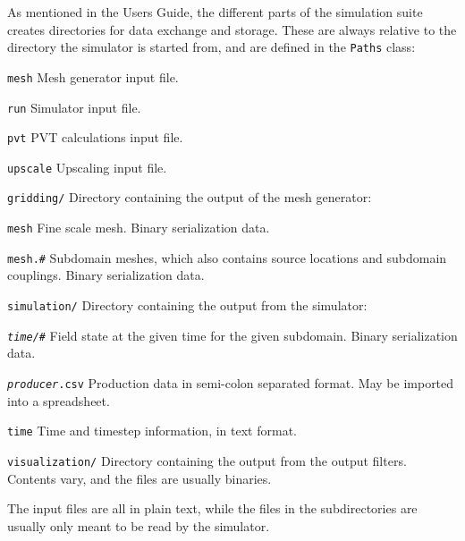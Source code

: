 

As mentioned in the Users Guide, the different parts of the simulation
suite creates directories for data exchange and storage. These are
always relative to the directory the simulator is started from, and
are defined in the \texttt{Paths} class:
\begin{list}{}{}
\item[\texttt{mesh}] Mesh generator input file.
\item[\texttt{run}] Simulator input file.
\item[\texttt{pvt}] PVT calculations input file.
\item[\texttt{upscale}] Upscaling input file.
\item[\texttt{gridding/}] Directory containing the output of the mesh
  generator:
  \begin{list}{}{}
  \item[\texttt{mesh}] Fine scale mesh. Binary serialization data.
  \item[\texttt{mesh.\#}] Subdomain meshes, which also contains source
    locations and subdomain couplings. Binary serialization data.
  \end{list}
\item[\texttt{simulation/}] Directory containing the output from the simulator:
  \begin{list}{}{}
  \item[\texttt{\textit{time/\#}}] Field state at the given time for
    the given subdomain. Binary serialization data.
  \item[\texttt{\textit{producer}.csv}] Production data in semi-colon
    separated format. May be imported into a spreadsheet.
  \item[\texttt{time}] Time and timestep information, in text format.
  \end{list}
\item[\texttt{visualization/}] Directory containing the output from
  the output filters. Contents vary, and the files are usually
  binaries.
\end{list}
The input files are all in plain text, while the files in the
subdirectories are usually only meant to be read by the simulator.




